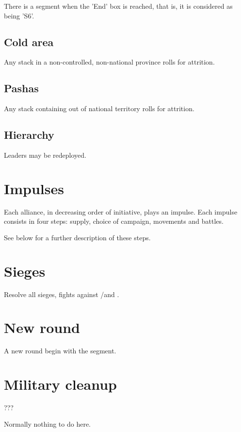 There is a  segment when the 'End' box is reached, that is,
it is considered as being 'S6'.

\subsection{Cold area}
Any stack in a non-controlled, non-national province rolls for attrition.

\subsection{Pashas}
Any stack containing \Timar out of \TUR national territory rolls for
attrition.

\subsection{Hierarchy}
Leaders may be redeployed.

\section{Impulses}
Each alliance, in decreasing order of initiative, plays an impulse. Each
impulse consists in four steps: supply, choice of campaign, movements and
battles.

See below for a further description of these steps.

\section{Sieges}
Resolve all sieges, fights against \REVOLT/\REBELLION and \corsaire.

\section{New round}
A new round begin with the  segment.

\section{Military cleanup}
???

Normally nothing to do here.

